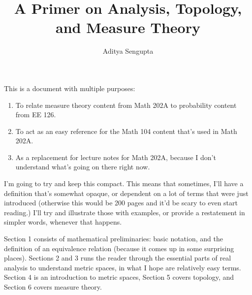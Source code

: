 \documentclass[10pt]{article}
\title{A Primer on Analysis, Topology, and Measure Theory}
\author{Aditya Sengupta}
\begin{document}
    \maketitle

    This is a document with multiple purposes:

\begin{enumerate}
    \item To relate measure theory content from Math 202A to probability content from EE 126.
    \item To act as an easy reference for the Math 104 content that's used in Math 202A.
    \item As a replacement for lecture notes for Math 202A, because I don't understand what's going on there right now.
\end{enumerate}

I'm going to try and keep this compact. %
This means that sometimes, I'll have a definition that's somewhat opaque, or dependent on a lot of terms that were just introduced (otherwise this would be 200 pages and it'd be scary to even start reading.) I'll try and illustrate those with examples, or provide a restatement in simpler words, whenever that happens.    

Section 1 consists of mathematical preliminaries: basic notation, and the definition of an equivalence relation (because it comes up in some surprising places). Sections 2 and 3 runs the reader through the essential parts of real analysis to understand metric spaces, in what I hope are relatively easy terms. Section 4 is an introduction to metric spaces, Section 5 covers topology, and Section 6 covers measure theory.

    \tableofcontents
    \let\tableofcontents\relax

    
    
    
    
    
    
    
\end{document}
